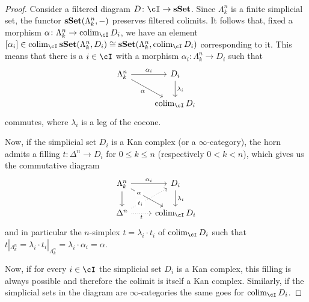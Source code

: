 \documentclass[a4paper,11pt,openany]{scrartcl}
\begin{document}
~\\
\begin{proof}
    Consider a filtered diagram $D\colon\cI\rightarrow\sSet$.
    Since $\Lambda^n_k$ is a finite simplicial set, the functor
    $\operatorname{\mathbf{sSet}}(\Lambda^n_k,-)$ preserves
    filtered colimits. It follows that, fixed a morphism
    $\alpha\colon\Lambda^n_k\rightarrow\colim_{\cI}D_i$, we have an element
    $[\alpha_i]\in\colim_{\cI}\sSet(\Lambda^n_k,D_i)\cong\sSet(\Lambda^n_k,\colim_{\cI}D_i)$
    corresponding to it. This means that there is a $i\in\cI$ with a morphism
    $\alpha_i\colon\Lambda^n_k\rightarrow D_i$ such that
    \[\begin{tikzcd}
        {\Lambda^n_k} & {D_i} \\
        {} & {\colim_{\cI}D_i}
        \arrow["{\lambda_i}", from=1-2, to=2-2]
        \arrow["{\alpha_i}", from=1-1, to=1-2]
        \arrow["\alpha"', from=1-1, to=2-2]
    \end{tikzcd}\]
    commutes, where $\lambda_i$ is a leg of the cocone.

    Now, if the simplicial set $D_i$ is a Kan complex (or a
    $\infty$-category), the horn admits a
    filling $t\colon\Delta^n\rightarrow D_i$ for $0\leq k\leq n$ (respectively
    $0<k<n$), which gives us the commutative diagram
    \[\begin{tikzcd}
        {\Lambda^n_k} & {D_i} \\
        {\Delta^n} & {\colim_{\cI}D_i}
        \arrow["{\lambda_i}", from=1-2, to=2-2]
        \arrow["{\alpha_i}", from=1-1, to=1-2]
        \arrow["\alpha"{description, pos=0.25}, from=1-1, to=2-2]
        \arrow["t"', dotted, from=2-1, to=2-2]
        \arrow[from=1-1, to=2-1]
        \arrow["{t_i}"{description, pos=0.25}, dotted, from=2-1, to=1-2]
    \end{tikzcd}\]
    and in particular the $n$-simplex $t=\lambda_i\cdot t_i$ of
    $\colim_{\cI}D_i$ such that $t|_{\Lambda^n_k}=\lambda_i\cdot
    t_i|_{\Lambda^n_k}=\lambda_i\cdot\alpha_i=\alpha$.

    Now, if for every $i\in\cI$ the simplicial set $D_i$ is a Kan complex, this
    filling is always possible and therefore the colimit is itself a Kan
    complex. Similarly, if the simplicial sets in the diagram are
    $\infty$-categories the same goes for $\colim_{\cI}D_i$.
\end{proof}
\end{document}
